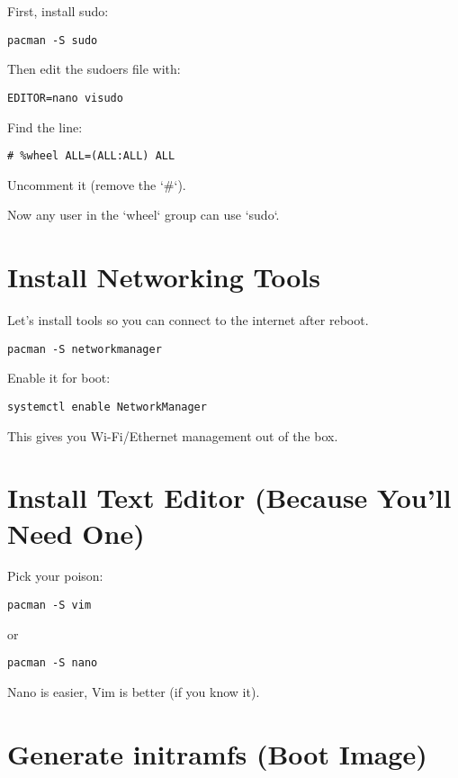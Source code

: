 \documentclass[12pt]{book}
\begin{document}
First, install sudo:

\begin{lstlisting}
pacman -S sudo
\end{lstlisting}

Then edit the sudoers file with:

\begin{lstlisting}
EDITOR=nano visudo
\end{lstlisting}

Find the line:

\begin{lstlisting}
# %wheel ALL=(ALL:ALL) ALL
\end{lstlisting}

Uncomment it (remove the `#`).

Now any user in the `wheel` group can use `sudo`.

\section{Install Networking Tools}

Let’s install tools so you can connect to the internet after reboot.

\begin{lstlisting}
pacman -S networkmanager
\end{lstlisting}

Enable it for boot:

\begin{lstlisting}
systemctl enable NetworkManager
\end{lstlisting}

This gives you Wi-Fi/Ethernet management out of the box.

\section{Install Text Editor (Because You’ll Need One)}

Pick your poison:

\begin{lstlisting}
pacman -S vim
\end{lstlisting}
or
\begin{lstlisting}
pacman -S nano
\end{lstlisting}

Nano is easier, Vim is better (if you know it).

\section{Generate initramfs (Boot Image)}
\end{document}
